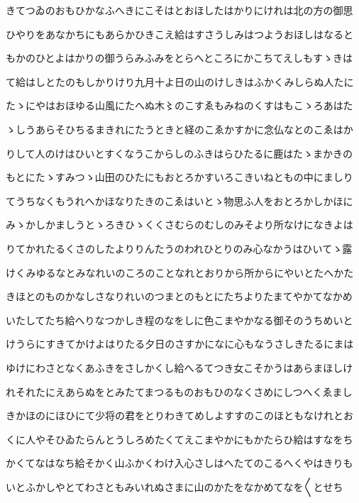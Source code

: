\documentclass[a4paper,11pt,landscape]{ltjtarticle}
\begin{document}
きてつゐのおもひかなふへきにこそはとおほしたはかりにけれは北の方の御思
\par\medskip
ひやりをあなかちにもあらかひきこえ給はすさうしみはつようおほしはなると
\par\medskip
もかのひとよはかりの御うらみふみをとらへところにかこちてえしもすゝきは
\par\medskip
て給はしとたのもしかりけり九月十よ日の山のけしきはふかくみしらぬ人たに
\par\medskip
たゝにやはおほゆる山風にたへぬ木〻のこすゑもみねのくすはもこゝろあはた
\par\medskip
ゝしうあらそひちるまきれにたうときと経のこゑかすかに念仏なとのこゑはか
\par\medskip
りして人のけはひいとすくなうこからしのふきはらひたるに鹿はたゝまかきの
\par\medskip
もとにたゝすみつゝ山田のひたにもおとろかすいろこきいねともの中にましり
\par\medskip
てうちなくもうれへかほなりたきのこゑはいとゝ物思ふ人をおとろかしかほに
\par\medskip
みゝかしかましうとゝろきひゝくくさむらのむしのみそより所なけになきよは
\par\medskip
りてかれたるくさのしたよりりんたうのわれひとりのみ心なかうはひいてゝ露
\par\medskip
けくみゆるなとみなれいのころのことなれとおりから所からにやいとたへかた
\par\medskip
きほとのものかなしさなりれいのつまとのもとにたちよりたまてやかてなかめ
\par\medskip
いたしてたち給へりなつかしき程のなをしに色こまやかなる御そのうちめいと
\par\medskip
けうらにすきてかけよはりたる夕日のさすかになに心もなうさしきたるにまは
\par\medskip
ゆけにわさとなくあふきをさしかくし給へるてつき女こそかうはあらまほしけ
\par\medskip
れそれたにえあらぬをとみたてまつるものおもひのなくさめにしつへくゑまし
\par\medskip
きかほのにほひにて少将の君をとりわきてめしよすすのこのほともなけれとお
\par\medskip
くに人やそひゐたらんとうしろめたくてえこまやかにもかたらひ給はすなをち
\par\medskip
かくてなはなち給そかく山ふかくわけ入心さしはへたてのこるへくやはきりも
\par\medskip
いとふかしやとてわさともみいれぬさまに山のかたをなかめてなを〱とせち
\par\medskip
\end{document}
